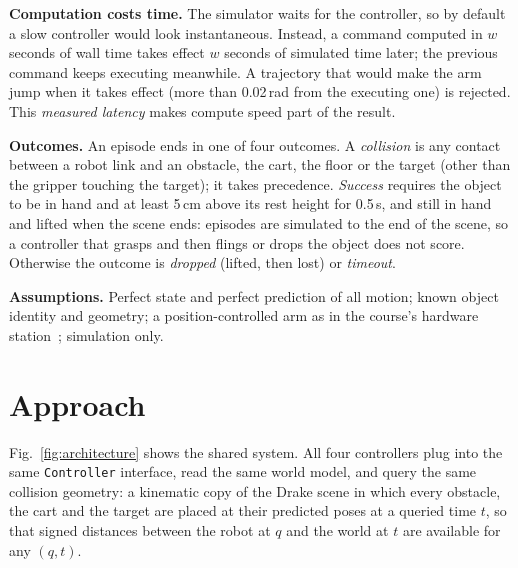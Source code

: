 \documentclass[conference]{IEEEtran}
\begin{document}
\textbf{Computation costs time.} The simulator waits for the controller, so by default a slow
controller would look instantaneous. Instead, a command computed in $w$ seconds of wall time takes
effect $w$ seconds of simulated time later; the previous command keeps executing meanwhile. A
trajectory that would make the arm jump when it takes effect (more than 0.02\,rad from the executing
one) is rejected. This \emph{measured latency} makes compute speed part of the result.

\textbf{Outcomes.} An episode ends in one of four outcomes. A \emph{collision} is any contact between
a robot link and an obstacle, the cart, the floor or the target (other than the gripper touching the
target); it takes precedence. \emph{Success} requires the object to be in hand and at least 5\,cm above
its rest height for 0.5\,s, and still in hand and lifted when the scene ends: episodes are simulated
to the end of the scene, so a controller that grasps and then flings or drops the object does not
score. Otherwise the outcome is \emph{dropped} (lifted, then lost) or \emph{timeout}.

\textbf{Assumptions.} Perfect state and perfect prediction of all motion; known object identity and
geometry; a position-controlled arm as in the course's hardware station~\cite{tedrake2024manipulation};
simulation only.

\section{Approach}
\label{sec:approach}

Fig.~\ref{fig:architecture} shows the shared system. All four controllers plug into the same
\texttt{Controller} interface, read the same world model, and query the same collision geometry: a
kinematic copy of the Drake scene in which every obstacle, the cart and the target are placed at their
predicted poses at a queried time $t$, so that signed distances between the robot at $q$ and the world
at $t$ are available for any $(q, t)$.
\end{document}
